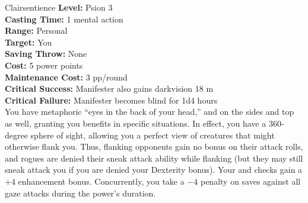{Clairsentience}
{
	\textbf{Level:}
	Psion 3\\
	\textbf{Casting Time:}
	1 mental action\\
	\textbf{Range:}
	Personal\\
	\textbf{Target:}
	You\\
	\textbf{Saving Throw:}
	None\\
	\textbf{Cost:}
	5 power points\\
	\textbf{Maintenance Cost:}
	3 pp/round\\
	\textbf{Critical Success:}
	Manifester also gains darkvision 18 m\\
	\textbf{Critical Failure:}
	Manifester becomes blind for 1d4 hours\\
}
{
	You have metaphoric ``eyes in the back of your head,'' and on the sides and top as well, granting you benefits in specific situations. In effect, you have a 360-degree sphere of sight, allowing you a perfect view of creatures that might otherwise flank you. Thus, flanking opponents gain no bonus on their attack rolls, and rogues are denied their sneak attack ability while flanking (but they may still sneak attack you if you are denied your Dexterity bonus). Your  and  checks gain a +4 enhancement bonus. Concurrently, you take a $-4$ penalty on saves against all gaze attacks during the power's duration. 
}
